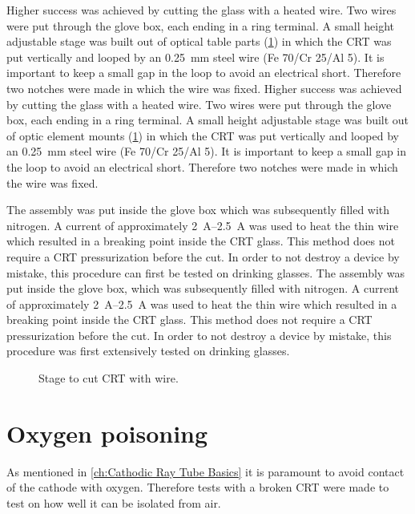Higher success was achieved by cutting the glass with a heated wire. Two wires were put through the glove box, each ending in a ring terminal. A small height adjustable stage was built out of optical table parts (\cref{fig:Stage to cut CRT with wire}) in which the CRT was put vertically and looped by an \SI{0.25}{\milli\meter} steel wire (Fe 70/Cr 25/Al 5). It is important to keep a small gap in the loop to avoid an electrical short. Therefore two notches were made in which the wire was fixed.
Higher success was achieved by cutting the glass with a heated wire. Two wires were put through the glove box, each ending in a ring terminal. A small height adjustable stage was built out of optic element mounts (\cref{fig:Stage to cut CRT with wire}) in which the CRT was put vertically and looped by an \SI{0.25}{\milli\meter} steel wire (Fe 70/Cr 25/Al 5). It is important to keep a small gap in the loop to avoid an electrical short. Therefore two notches were made in which the wire was fixed.

The assembly was put inside the glove box which was subsequently filled with nitrogen. A current of approximately \SIrange{2}{2.5}{\ampere} was used to heat the thin wire which resulted in a breaking point inside the CRT glass. This method does not require a CRT pressurization before the cut. In order to not destroy a device by mistake, this procedure can first be tested on drinking glasses.
The assembly was put inside the glove box, which was subsequently filled with nitrogen. A current of approximately \SIrange{2}{2.5}{\ampere} was used to heat the thin wire which resulted in a breaking point inside the CRT glass. This method does not require a CRT pressurization before the cut. In order to not destroy a device by mistake, this procedure was first extensively tested on drinking glasses.

\begin{figure}[ht]
	
	\caption{Stage to cut CRT with wire.}
	\label{fig:Stage to cut CRT with wire}
\end{figure}


\section{Oxygen poisoning}
\label{sec:Oxygen poisoning}


As mentioned in \cref{ch:Cathodic Ray Tube Basics} it is paramount to avoid contact of the cathode with oxygen. Therefore tests with a broken CRT were made to test on how well it can be isolated from air.


